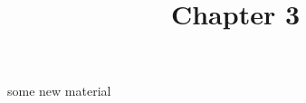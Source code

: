 \documentclass[11pt]{article}
\begin{document}
\title{Chapter 3}
\date{}
\maketitle



\section*{}
some new material
\end{document}
